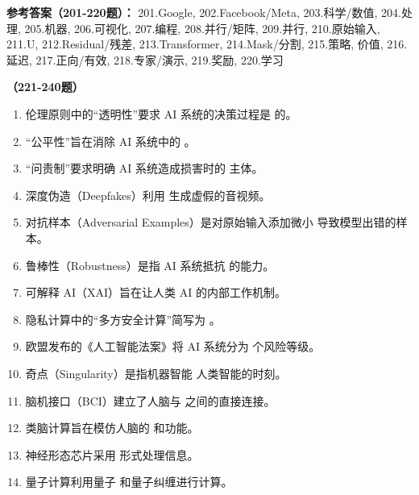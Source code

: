 \textbf{参考答案（201-220题）：}
201.Google, 202.Facebook/Meta, 203.科学/数值, 204.处理, 205.机器, 206.可视化, 207.编程, 208.并行/矩阵, 209.并行, 210.原始输入, 211.U, 212.Residual/残差, 213.Transformer, 214.Mask/分割, 215.策略, 价值, 216.延迟, 217.正向/有效, 218.专家/演示, 219.奖励, 220.学习

\vspace{1em}
\textbf{（221-240题）}
\begin{enumerate}[resume,leftmargin=2em,itemsep=1pt]
\item 伦理原则中的“透明性”要求 AI 系统的决策过程是 \underline{\hspace{3em}} 的。
\item “公平性”旨在消除 AI 系统中的 \underline{\hspace{3em}}。
\item “问责制”要求明确 AI 系统造成损害时的 \underline{\hspace{3em}} 主体。
\item 深度伪造（Deepfakes）利用 \underline{\hspace{3em}} 生成虚假的音视频。
\item 对抗样本（Adversarial Examples）是对原始输入添加微小 \underline{\hspace{3em}} 导致模型出错的样本。
\item 鲁棒性（Robustness）是指 AI 系统抵抗 \underline{\hspace{3em}} 的能力。
\item 可解释 AI（XAI）旨在让人类 \underline{\hspace{3em}} AI 的内部工作机制。
\item 隐私计算中的“多方安全计算”简写为 \underline{\hspace{3em}}。
\item 欧盟发布的《人工智能法案》将 AI 系统分为 \underline{\hspace{3em}} 个风险等级。
\item 奇点（Singularity）是指机器智能 \underline{\hspace{3em}} 人类智能的时刻。
\item 脑机接口（BCI）建立了人脑与 \underline{\hspace{3em}} 之间的直接连接。
\item 类脑计算旨在模仿人脑的 \underline{\hspace{3em}} 和功能。
\item 神经形态芯片采用 \underline{\hspace{3em}} 形式处理信息。
\item 量子计算利用量子 \underline{\hspace{3em}} 和量子纠缠进行计算。

\end{enumerate}
